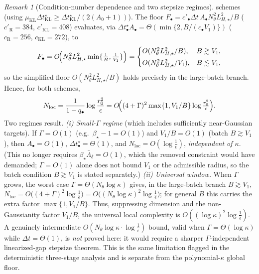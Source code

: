 \documentclass[11pt]{article}
\theoremstyle{plain}
\theoremstyle{definition}
\theoremstyle{remark}
\newtheorem{remark}[remark]{Remark}
\newcommand{\KL}{\mathrm{KL}}
\newcommand{\Riem}{\mathrm{R}}
\newcommand{\LHs}{L_{H,\star}}
\begin{document}
\begin{remark}[Condition-number dependence and two stepsize regimes]
schemes (using $\mu_{\KL}\Delta t_{\KL}^\star\geq\Delta t_{\KL}^\star/(2(A_0+1))$). The floor
$F_\bullet=c'_\bullet\Delta t\,A_\bullet N_\theta^2\LHs^2/B$ ($c'_{\Riem}=384$, $c'_{\KL}=408$)
evaluates, via $\Delta t_\bullet^\star A_\bullet=\Theta(\min\{2,B/(c_\bullet V_1)\})$ ($c_{\Riem}=256$,
$c_{\KL}=272$), to
\[
    F_\bullet=O\!\Bigl(N_\theta^2\LHs^2\min\{\tfrac1B,\tfrac1{V_1}\}\Bigr)
    =\begin{cases}O(N_\theta^2\LHs^2/B), & B\gtrsim V_1,\\[1mm] O(N_\theta^2\LHs^2/V_1), & B\lesssim V_1,\end{cases}
\]
so the simplified floor $O(N_\theta^2\LHs^2/B)$ holds precisely in the large-batch branch. Hence, for
both schemes,
\[
    N_{\mathrm{loc}}=\frac1{1-q_\bullet}\log\frac{r_0^2}\epsilon
    =O\!\Bigl((4+\Gamma)^2\max\{1,V_1/B\}\log\tfrac{r_0^2}\epsilon\Bigr).
\]
Two regimes result.
\emph{(i) Small-$\Gamma$ regime} (which includes sufficiently near-Gaussian targets). If $\Gamma=O(1)$
(e.g.\ $\beta_\star-1=O(1)$) and $V_1/B=O(1)$ (batch $B\gtrsim V_1$), then $A_\bullet=O(1)$,
$\Delta t_\bullet^\star=\Theta(1)$, and $N_{\mathrm{loc}}=O(\log\tfrac1\epsilon)$, \emph{independent of
$\kappa$}. (This no longer requires
$\beta_\star\bar\Lambda_\delta=O(1)$, which the removed constraint would have demanded; $\Gamma=O(1)$
alone does not bound $V_1$ or the admissible radius, so the batch condition $B\gtrsim V_1$ is stated
separately.)
\emph{(ii) Universal window.} When $\Gamma$ grows, the worst case $\Gamma=\Theta(N_\theta\log\kappa)$
gives, in the large-batch branch $B\gtrsim V_1$,
$N_{\mathrm{loc}}=O\bigl((4+\Gamma)^2\log\tfrac1\epsilon\bigr)=O\bigl((N_\theta\log\kappa)^2\log\tfrac1\epsilon\bigr)$;
for general $B$ this carries the extra factor $\max\{1,V_1/B\}$.
Thus, suppressing dimension and the non-Gaussianity factor $V_1/B$, the universal local complexity is
$O((\log\kappa)^2\log\tfrac1\epsilon)$. A genuinely intermediate $O(N_\theta\log\kappa\cdot\log\tfrac1\epsilon)$
bound, valid when $\Gamma=\Theta(\log\kappa)$ while $\Delta t=\Theta(1)$, is \emph{not} proved here: it
would require a sharper $\Gamma$-independent linearized-gap stepsize theorem. This is the same
limitation flagged in the deterministic three-stage analysis and is separate from the
polynomial-$\kappa$ global floor.
\end{remark}
\end{document}
